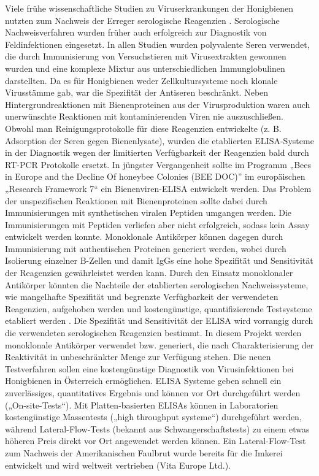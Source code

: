 Viele frühe wissenschaftliche Studien zu Viruserkrankungen der Honigbienen nutzten zum Nachweis der Erreger serologische Reagenzien \citep{Anderson1984}. Serologische Nachweisverfahren wurden früher auch erfolgreich zur Diagnostik von Feldinfektionen eingesetzt. In allen Studien wurden polyvalente Seren verwendet, die durch Immunisierung von Versuchstieren mit Virusextrakten gewonnen wurden und eine komplexe Mixtur aus unterschiedlichen Immunglobulinen darstellten. Da es für Honigbienen weder Zellkultursysteme noch klonale Virusstämme gab, war die Spezifität der Antiseren beschränkt. Neben Hintergrundreaktionen mit Bienenproteinen aus der Virusproduktion waren auch unerwünschte Reaktionen mit kontaminierenden Viren nie auszuschließen. Obwohl man Reinigungsprotokolle für diese Reagenzien entwickelte (z. B. Adsorption der Seren gegen Bienenlysate), wurden die etablierten ELISA-Systeme in der Diagnostik wegen der limitierten Verfügbarkeit der Reagenzien bald durch RT-PCR Protokolle ersetzt. In jüngster Vergangenheit sollte im Programm „Bees in Europe and the Decline Of honeybee Colonies (BEE DOC)” im europäischen „Research Framework 7“ ein Bienenviren-ELISA entwickelt werden. Das Problem der unspezifischen Reaktionen mit Bienenproteinen sollte dabei durch Immunisierungen mit synthetischen viralen Peptiden umgangen werden. Die Immunisierungen mit Peptiden verliefen aber nicht erfolgreich, sodass kein Assay entwickelt werden konnte. Monoklonale Antikörper können dagegen durch Immunisierung mit authentischen Proteinen generiert werden, wobei durch Isolierung einzelner B-Zellen und damit IgGs eine hohe Spezifität und Sensitivität der Reagenzien gewährleistet werden kann. Durch den Einsatz monoklonaler Antikörper könnten die Nachteile der etablierten serologischen Nachweissysteme, wie mangelhafte Spezifität und begrenzte Verfügbarkeit der verwendeten Reagenzien, aufgehoben werden und kostengünstige, quantifizierende Testsysteme etabliert werden \citep{Usuda1999}.
Die Spezifität und Sensitivität der ELISA wird vorrangig durch die verwendeten serologischen Reagenzien bestimmt. In diesem Projekt werden monoklonale Antikörper verwendet bzw. generiert, die nach Charakterisierung der Reaktivität in unbeschränkter Menge zur Verfügung stehen. Die neuen Testverfahren sollen eine kostengünstige Diagnostik von Virusinfektionen bei Honigbienen in Österreich ermöglichen. ELISA Systeme geben schnell ein zuverlässiges, quantitatives Ergebnis und können vor Ort durchgeführt werden („On-site-Tests“). Mit Platten-basierten ELISAs können in Laboratorien kostengünstige Massentests („high throughput systeme“) durchgeführt werden, während Lateral-Flow-Tests (bekannt aus Schwangerschaftstests) zu einem etwas höheren Preis direkt vor Ort angewendet werden können. Ein Lateral-Flow-Test zum Nachweis der Amerikanischen Faulbrut wurde bereits für die Imkerei entwickelt und wird weltweit vertrieben (Vita Europe Ltd.).




